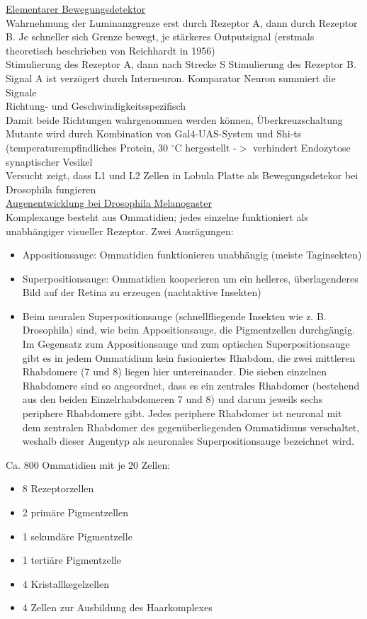 \underline{Elementarer Bewegungsdetektor}\\
Wahrnehmung der Luminanzgrenze erst durch Rezeptor A, dann durch Rezeptor B. Je schneller sich Grenze bewegt, je stärkeres Outputsignal (erstmals theoretisch beschrieben von Reichhardt in 1956)\\
Stimulierung des Rezeptor A, dann nach Strecke S Stimulierung des Rezeptor B. Signal A ist verzögert durch Interneuron. Komparator Neuron summiert die Signale\\
Richtung- und Geschwindigkeitsspezifisch\\
Damit beide Richtungen wahrgenommen werden können, Überkreuzschaltung\\
Mutante wird durch Kombination von Gal4-UAS-System und Shi-ts (temperaturempfindliches Protein, 30 $^\circ$C hergestellt -$>$ verhindert Endozytose synaptischer Vesikel\\
Versucht zeigt, dass L1 und L2 Zellen in Lobula Platte als Bewegungsdetekor bei Drosophila fungieren\\

\underline{Augenentwicklung bei Drosophila Melanogaster}\\
Komplexauge besteht aus Ommatidien; jedes einzelne funktioniert als unabhängiger visueller Rezeptor. Zwei Ausrägungen:
\begin{itemize}
	\item Appositionsauge: Ommatidien funktionieren unabhängig (meiste Taginsekten)
	\item Superpositionsauge: Ommatidien kooperieren um ein helleres, überlagenderes Bild auf der Retina zu erzeugen (nachtaktive Insekten)
	\item Beim neuralen Superpositionsauge (schnellfliegende Insekten wie z. B. Drosophila) sind, wie beim Appositionsauge, die Pigmentzellen durchgängig. Im Gegensatz zum Appositionsauge und zum optischen Superpositionsauge gibt es in jedem Ommatidium kein fusioniertes Rhabdom, die zwei mittleren Rhabdomere (7 und 8) liegen hier untereinander. Die sieben einzelnen Rhabdomere sind so angeordnet, dass es ein zentrales Rhabdomer (bestehend aus den beiden Einzelrhabdomeren 7 und 8) und darum jeweils sechs periphere Rhabdomere gibt. Jedes periphere Rhabdomer ist neuronal mit dem zentralen Rhabdomer des gegenüberliegenden Ommatidiums verschaltet, weshalb dieser Augentyp als neuronales Superpositionsauge bezeichnet wird.
\end{itemize}

Ca. 800 Ommatidien mit je 20 Zellen:
\begin{itemize}
	\item 8 Rezeptorzellen
	\item 2 primäre Pigmentzellen
	\item 1 sekundäre Pigmentzelle
	\item 1 tertiäre Pigmentzelle
	\item 4 Kristallkegelzellen
	\item 4 Zellen zur Ausbildung des Haarkomplexes
\end{itemize}

